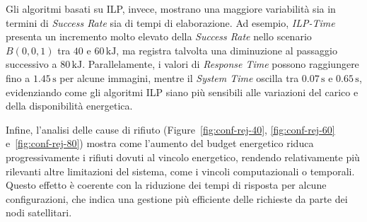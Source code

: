 \documentclass[12pt]{article}
\begin{document}
Gli algoritmi basati su ILP, invece, mostrano una maggiore variabilità sia in termini di \textit{Success Rate} sia di tempi di elaborazione. Ad esempio, \textit{ILP-Time} presenta un incremento molto elevato della \textit{Success Rate} nello scenario $B(0,0,1)$ tra $40$ e $60\,\mathrm{kJ}$, ma registra talvolta una diminuzione al passaggio successivo a $80\,\mathrm{kJ}$. Parallelamente, i valori di \textit{Response Time} possono raggiungere fino a $1.45\,\mathrm{s}$ per alcune immagini, mentre il \textit{System Time} oscilla tra $0.07\,\mathrm{s}$ e $0.65\,\mathrm{s}$, evidenziando come gli algoritmi ILP siano più sensibili alle variazioni del carico e della disponibilità energetica.

Infine, l’analisi delle cause di rifiuto (Figure~\ref{fig:conf-rej-40}, \ref{fig:conf-rej-60} e~\ref{fig:conf-rej-80}) mostra come l’aumento del budget energetico riduca progressivamente i rifiuti dovuti al vincolo energetico, rendendo relativamente più rilevanti altre limitazioni del sistema, come i vincoli computazionali o temporali. Questo effetto è coerente con la riduzione dei tempi di risposta per alcune configurazioni, che indica una gestione più efficiente delle richieste da parte dei nodi satellitari.
\end{document}
